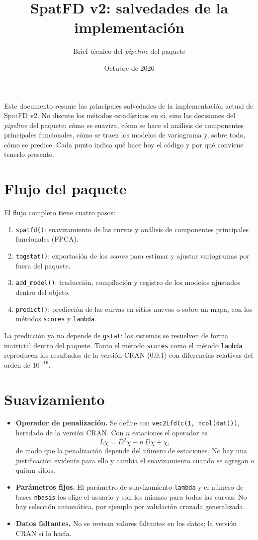 \documentclass[11pt,a4paper]{article}
\title{SpatFD v2: salvedades de la implementación}
\author{Brief técnico del \emph{pipeline} del paquete}
\date{Octubre de 2026}
\newcommand{\code}[1]{\texttt{#1}}
\begin{document}
\maketitle

\noindent
Este documento resume las principales salvedades de la implementación actual
de SpatFD v2. No discute los métodos estadísticos en sí, sino las decisiones
del \emph{pipeline} del paquete: cómo se suaviza, cómo se hace el análisis de
componentes principales funcionales, cómo se traen los modelos de variograma
y, sobre todo, cómo se predice. Cada punto indica qué hace hoy el código y por
qué conviene tenerlo presente.

\section{Flujo del paquete}

El flujo completo tiene cuatro pasos:
\begin{enumerate}
  \item \code{spatfd()}: suavizamiento de las curvas y análisis de componentes
        principales funcionales (FPCA).
  \item \code{togstat()}: exportación de los \emph{scores} para estimar y
        ajustar variogramas por fuera del paquete.
  \item \code{add\_model()}: traducción, compilación y registro de los modelos
        ajustados dentro del objeto.
  \item \code{predict()}: predicción de las curvas en sitios nuevos o sobre un
        mapa, con los métodos \code{scores} y \code{lambda}.
\end{enumerate}
La predicción ya no depende de \code{gstat}: los sistemas se resuelven de
forma matricial dentro del paquete. Tanto el método \code{scores} como el
método \code{lambda} reproducen los resultados de la versión CRAN (0.0.1) con
diferencias relativas del orden de $10^{-16}$.

\section{Suavizamiento}

\begin{itemize}
  \item \textbf{Operador de penalización.} Se define con
        \code{vec2Lfd(c(1, ncol(dat)))}, heredado de la versión CRAN. Con $n$
        estaciones el operador es
        \[
          L\chi = D^2\chi + n\,D\chi + \chi ,
        \]
        de modo que la penalización depende del número de estaciones. No hay
        una justificación evidente para ello y cambia el suavizamiento cuando
        se agregan o quitan sitios.
  \item \textbf{Parámetros fijos.} El parámetro de suavizamiento
        \code{lambda} y el número de bases \code{nbasis} los elige el usuario
        y son los mismos para todas las curvas. No hay selección automática,
        por ejemplo por validación cruzada generalizada.
  \item \textbf{Datos faltantes.} No se revisan valores faltantes en los
        datos; la versión CRAN sí lo hacía.
\end{itemize}
\end{document}
